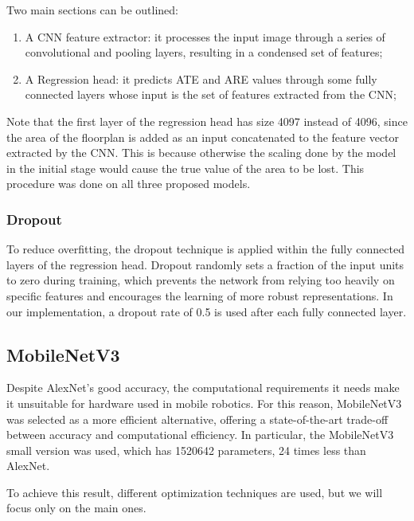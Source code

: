 \noindent
Two main sections can be outlined: 
\begin{enumerate}
    \item A CNN feature extractor: it processes the input image through a series of convolutional and 
        pooling layers, resulting in a condensed set of features;
    \item A Regression head: it predicts ATE and ARE values through some fully connected layers whose
        input is the set of features extracted from the CNN;
\end{enumerate}

\noindent
Note that the first layer of the regression head has size 4097 instead of 4096, since the area of the 
floorplan is added as an input concatenated to the feature vector extracted by the CNN. This is because
otherwise the scaling done by the model in the initial stage would cause the true value of the area to
be lost. This procedure was done on all three proposed models.

\subsubsection{Dropout}
To reduce overfitting, the dropout technique \cite{srivastava2014dropout} is applied within the fully
connected layers of the regression head. Dropout randomly sets a fraction of the input units to zero during
training, which prevents the network from relying too heavily on specific features and encourages the 
learning of more robust representations. In our implementation, a dropout rate of 0.5 is used after each
fully connected layer.

\subsection{MobileNetV3}
Despite AlexNet's good accuracy, the computational requirements it needs make it unsuitable for hardware
used in mobile robotics. For this reason, MobileNetV3 was selected as a more efficient alternative, 
offering a state-of-the-art trade-off between accuracy and computational efficiency. In particular, the
MobileNetV3 small version was used, which has \num{1520642} parameters, 24 times less than AlexNet.

To achieve this result, different optimization techniques are used, but we will focus only on the main ones.

